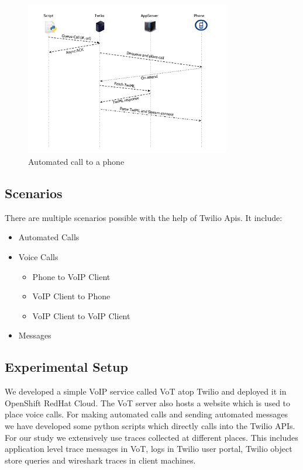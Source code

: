 \begin{figure}[t!] 
\centering
  \includegraphics[width=0.8\textwidth]{figs/auto.pdf}
\caption{Automated call to a phone}
\label{fig:autocall}
\end{figure} 

\subsection{Scenarios}

There are multiple scenarios possible with the help of Twilio Apis. It include:

\begin{itemize}
\item Automated Calls
\item Voice Calls
\begin{itemize}
\item Phone to VoIP Client
\item VoIP Client to Phone
\item VoIP Client to VoIP Client
\end{itemize}
\item Messages
\end{itemize}

\subsection{Experimental Setup}

We developed a simple VoIP service called VoT atop Twilio and deployed it in OpenShift RedHat Cloud. The VoT server also hosts a website which is used to place voice calls. For making automated calls and sending automated messages we have developed some python scripts which directly calls into the Twilio APIs. For our study we extensively use traces collected at different places. This includes application level trace messages in VoT, logs in Twilio user portal, Twilio object store queries and wireshark traces in client machines.

